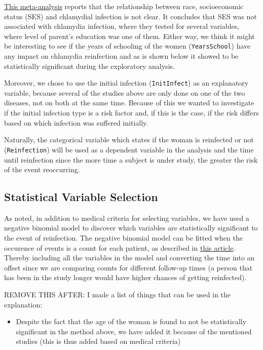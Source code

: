 \documentclass[
]{article}
\providecommand{\tightlist}{%
  \setlength{\itemsep}{0pt}\setlength{\parskip}{0pt}}
\begin{document}
\href{https://www.ncbi.nlm.nih.gov/pmc/articles/PMC2094865/}{This meta-analysis} reports that the relationship between race, socioeconomic status (SES) and chlamydial infection is not clear. It concludes that SES was not associated with chlamydia infection, where they tested for several variables, where level of parent's education was one of them. Either way, we think it might be interesting to see if the years of schooling of the women (\texttt{YearsSchool}) have any impact on chlamydia reinfection and as is shown below it showed to be statistically significant during the exploratory analysis.

Moreover, we chose to use the initial infection (\texttt{InitInfect}) as an explanatory variable, because several of the studies above are only done on one of the two diseases, not on both at the same time. Because of this we wanted to investigate if the initial infection type is a risk factor and, if this is the case, if the risk differs based on which infection was suffered initially.

Naturally, the categorical variable which states if the woman is reinfected or not (\texttt{Reinfection}) will be used as a dependent variable in the analysis and the time until reinfection since the more time a subject is under study, the greater the risk of the event reoccurring.

\hypertarget{statistical-variable-selection}{%
\subsection{Statistical Variable Selection}\label{statistical-variable-selection}}

As noted, in addition to medical criteria for selecting variables, we have used a negative binomial model to discover which variables are statistically significant to the event of reinfection. The negative binomial model can be fitted when the occurence of events is a count for each patient, as described in \href{https://pubmed.ncbi.nlm.nih.gov/22083507/}{this article}. Thereby including all the variables in the model and converting the time into an offset since we are comparing counts for different follow-up times (a person that has been in the study longer would have higher chances of getting reinfected).

REMOVE THIS AFTER: I made a list of things that can be used in the explanation:

\begin{itemize}
\tightlist
\item
  Despite the fact that the age of the woman is found to not be statistically significant in the method above, we have added it because of the mentioned studies (this is thus added based on medical criteria)
\end{itemize}
\end{document}
